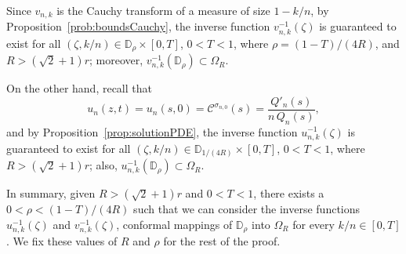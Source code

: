 \documentclass[reqno,11pt]{amsart}
\theoremstyle{plain}
\theoremstyle{definition}
\theoremstyle{remark}
\numberwithin{equation}{section}
\numberwithin{equation}{section}
\begin{document}
Since $v_{n,k} $ is the Cauchy transform of a measure of size $1-k/n$, by Proposition~\ref{prob:boundsCauchy}, the inverse function $v_{n,k}^{-1}(\zeta)$ is guaranteed to exist for all $(\zeta,k/n)\in \mathbb D_\rho \times [0,T]$, $0<T<1$, where $\rho = (1-T)/(4R)$, and $R>(\sqrt{2}+1)r$; moreover, $v_{n,k}^{-1}(\mathbb D_\rho)\subset \Omega_R$.

On the other hand, recall that 
$$	
u_n(z,t) = u_n (s, 0) = \mathcal C^{\sigma_{n,0}}(s) =  \frac{  Q'_{n }(s)}{n\, Q_{n }(s)},
$$
and by Proposition~\ref{prop:solutionPDE}, the inverse function $u_{n,k}^{-1}(\zeta)$ is guaranteed to exist for all $(\zeta,k/n)\in \mathbb D_{1/(4R)} \times [0,T]$, $0<T<1$, where $R>(\sqrt{2}+1)r$; also, $u_{n,k}^{-1}(\mathbb D_\rho)\subset \Omega_R$.

In summary, given $R>(\sqrt{2}+1)r$ and $0<T<1$, there exists a $0<\rho<(1-T)/(4R)$ such that we can consider the inverse functions $u_{n,k}^{-1}(\zeta )$ and $v_{n,k}^{-1}(\zeta )$, conformal mappings of $\mathbb D_\rho$ into $\Omega_R$ for every $k/n\in [0,T]$. We fix these values of $R$ and $\rho$ for the rest of the proof. 
\end{document}
